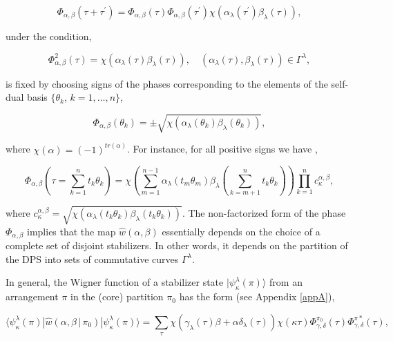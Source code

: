 \documentclass[quantumrep,article,submit,pdftex,moreauthors]{Definitions/mdpi}
\begin{document}
\begin{equation}
  \Phi_{\alpha,\beta}\left(\tau+\tau^{\prime}\right)
  = \Phi_{\alpha,\beta}(\tau) \Phi_{\alpha,\beta }(\tau^{\prime})
  \chi\left( \alpha_{\lambda}(\tau^{\prime}) \beta_{\lambda}(\tau) \right),
  \label{phase 2}
\end{equation}

under the condition,

\begin{equation*}
  \Phi_{\alpha,\beta}^{2}(\tau)
  = \chi\left( \alpha_{\lambda}(\tau) \beta_{\lambda}(\tau ) \right),
  \quad \left(\alpha_{\lambda}(\tau), \beta_{\lambda}(\tau)\right)
  \in \Gamma^{\lambda},
\end{equation*}

is fixed by choosing signs of the phases corresponding to the elements of the
self-dual basis $\{\theta_{k}$, $k=1,\ldots,n\}$,

\begin{equation}
  \Phi_{\alpha,\beta}(\theta_{k})
  = \pm \sqrt{\chi\left(
    \alpha_{\lambda}(\theta_{k})\beta_{\lambda }(\theta_{k})
  \right)},
  \label{Phib}
\end{equation}

where $\chi(\alpha)=(-1)^{tr(\alpha)}$. For instance, for all positive signs we
have \cite{klimov06},

\begin{equation}
  \Phi_{\alpha,\beta}\left(
    \tau = \sum\limits_{k=1}^{n}t_{k}\theta_{k}
  \right)
  = \chi\left(
    \sum\limits_{m=1}^{n-1} \alpha_{\lambda}(t_{m}\theta _{m})\beta_{\lambda}
    \left( \sum\limits_{k=m+1}^{n} t_{k} \theta_{k} \right)
  \right)
  \prod\limits_{k=1}^{n}c_{\kappa }^{\alpha,\beta },
  \label{Phi G}
\end{equation}

where $c_{\kappa}^{\alpha,\beta}=\sqrt{\chi\left(
\alpha_{\lambda}(t_{k}\theta_{k})\beta_{\lambda}\left(t_{k}\theta_{k}\right)
\right)}$. The non-factorized form of the phase $\Phi_{\alpha,\beta}$ implies
that the map $\hat{w}(\alpha,\beta)$ essentially depends on the choice of a
complete set of disjoint stabilizers. In other words, it depends on the
partition of the DPS into sets of commutative curves $\Gamma^{\lambda}$.

In general, the Wigner function of a stabilizer state
$|\psi_{\kappa}^{\lambda}(\pi)\rangle$ from an  arrangement $\pi$ in the (core)
partition $\pi_{0}$ has the form (see Appendix \ref{appA}),

\begin{equation}
  \langle \psi_{\kappa}^{\lambda}(\pi)
  |\hat{w}\left( \alpha,\beta\,|\,\pi_{0}\right)
  |\psi_{\kappa}^{\lambda}(\pi)\rangle
  = \sum_{\tau} \chi\left(
    \gamma_{\lambda}(\tau)\beta+\alpha \delta_{\lambda}(\tau)
  \right)
  \chi(\kappa\tau) \Phi_{\gamma,\delta}^{\pi_{0}}(\tau)
  \Phi_{\gamma,\delta}^{\pi\ast}(\tau),
  \label{WF qubit}
\end{equation}
\end{document}
